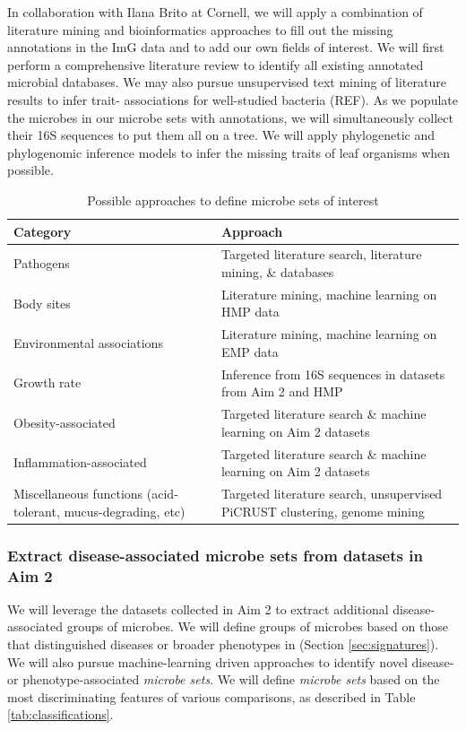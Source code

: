 \documentclass[12pt]{article}
\begin{document}
In collaboration with Ilana Brito at Cornell, we will apply a 
combination of literature mining and bioinformatics approaches to fill 
out the missing annotations in the ImG data and to add our own fields 
of interest. We will first perform a comprehensive literature review 
to identify all existing annotated microbial databases. We may also 
pursue unsupervised text mining of literature results to infer trait-
associations for well-studied bacteria (REF). As we populate the 
microbes in our microbe sets with annotations, we will simultaneously 
collect their 16S sequences to put them all on a tree. We will apply 
phylogenetic and phylogenomic inference models to infer the missing 
traits of leaf organisms when possible.

\begin{table}
\begin{tabular}{|p{6cm}|p{10cm}|}
	\hline
	\textbf{Category} & \textbf{Approach} \\
	\hline
	Pathogens & Targeted literature search, literature mining, \& 
	databases \\
	\hline
	Body sites & Literature mining, machine learning on HMP data \\
	\hline
	Environmental associations & Literature mining, machine learning 
	on EMP data \\
	\hline
	Growth rate & Inference from 16S sequences in datasets from Aim 2 
	and HMP \\
	\hline
	Obesity-associated & Targeted literature search \& machine 
	learning on Aim 2 datasets \\
	\hline
	Inflammation-associated & Targeted literature search \& machine 
	learning on Aim 2 datasets \\
	\hline
	Miscellaneous functions (acid-tolerant, mucus-degrading, etc) & 
	Targeted literature search, unsupervised PiCRUST clustering, 
	genome mining \\
	\hline 
\end{tabular}
\caption{Possible approaches to define microbe sets of interest}\label{tab:microbe_set_categories}
\end{table}


\subsubsection{Extract disease-associated microbe sets from datasets in Aim 2}
We will leverage the datasets collected in Aim 2 to extract additional 
disease-associated groups of microbes. We will define groups of 
microbes based on those that distinguished diseases or broader 
phenotypes in (Section \ref{sec:signatures}). We will also pursue 
machine-learning driven approaches to identify novel disease- or 
phenotype-associated \textit{microbe sets}. We will define 
\textit{microbe sets} based on the most discriminating features of 
various comparisons, as described in Table \ref{tab:classifications}.
\end{document}
